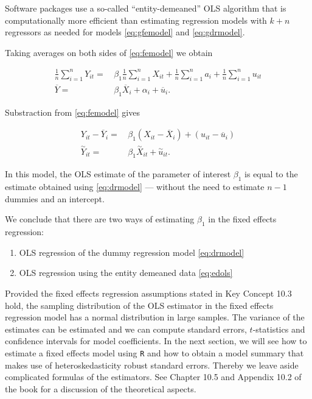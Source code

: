 \documentclass[]{book}
\theoremstyle{definition}
\theoremstyle{definition}
\theoremstyle{definition}
\theoremstyle{remark}
\begin{document}
Software packages use a so-called ``entity-demeaned'' OLS algorithm that
is computationally more efficient than estimating regression models with
\(k+n\) regressors as needed for models \eqref{eq:gfemodel} and
\eqref{eq:gdrmodel}.

Taking averages on both sides of \eqref{eq:femodel} we obtain

\begin{align*}
\frac{1}{n} \sum_{i=1}^n Y_{it} =& \, \beta_1 \frac{1}{n} \sum_{i=1}^n X_{it} + \frac{1}{n} \sum_{i=1}^n a_i + \frac{1}{n} \sum_{i=1}^n u_{it} \\
\overline{Y} =& \, \beta_1 \overline{X}_i + \alpha_i + \overline{u}_i. 
\end{align*}

Substraction from \eqref{eq:femodel} gives

\begin{align}
Y_{it} - \overline{Y}_i =& \, \beta_1(X_{it}-\overline{X}_i) + (u_{it} - \overline{u}_i) \\
\overset{\sim}{Y}_{it} =& \, \beta_1 \overset{\sim}{X}_{it} + \overset{\sim}{u}_{it}. \label{eq:edols}
\end{align}

In this model, the OLS estimate of the parameter of interest \(\beta_1\)
is equal to the estimate obtained using \eqref{eq:drmodel} --- without the
need to estimate \(n-1\) dummies and an intercept.

We conclude that there are two ways of estimating \(\beta_1\) in the
fixed effects regression:

\begin{enumerate}
\def\labelenumi{\arabic{enumi}.}
\item
  OLS regression of the dummy regression model \eqref{eq:drmodel}
\item
  OLS regression using the entity demeaned data \eqref{eq:edols}
\end{enumerate}

Provided the fixed effects regression assumptions stated in Key Concept
10.3 hold, the sampling distribution of the OLS estimator in the fixed
effects regression model has a normal distribution in large samples. The
variance of the estimates can be estimated and we can compute standard
errors, \(t\)-statistics and confidence intervals for model
coefficients. In the next section, we will see how to estimate a fixed
effects model using \texttt{R} and how to obtain a model summary that
makes use of heteroskedasticity robust standard errors. Thereby we leave
aside complicated formulas of the estimators. See Chapter 10.5 and
Appendix 10.2 of the book for a discussion of the theoretical aspects.
\end{document}
